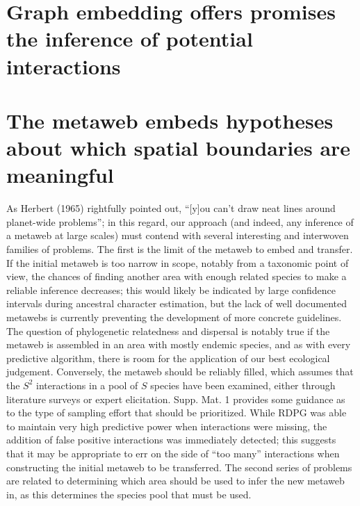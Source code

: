 \documentclass[11pt]{article}
\begin{document}
\hypertarget{graph-embedding-offers-promises-the-inference-of-potential-interactions}{%
\section{Graph embedding offers promises the inference of potential
interactions}\label{graph-embedding-offers-promises-the-inference-of-potential-interactions}}

\hypertarget{the-metaweb-embeds-hypotheses-about-which-spatial-boundaries-are-meaningful}{%
\section{The metaweb embeds hypotheses about which spatial boundaries
are
meaningful}\label{the-metaweb-embeds-hypotheses-about-which-spatial-boundaries-are-meaningful}}

As Herbert (1965) rightfully pointed out, ``{[}y{]}ou can't draw neat
lines around planet-wide problems''; in this regard, our approach (and
indeed, any inference of a metaweb at large scales) must contend with
several interesting and interwoven families of problems. The first is
the limit of the metaweb to embed and transfer. If the initial metaweb
is too narrow in scope, notably from a taxonomic point of view, the
chances of finding another area with enough related species to make a
reliable inference decreases; this would likely be indicated by large
confidence intervals during ancestral character estimation, but the lack
of well documented metawebs is currently preventing the development of
more concrete guidelines. The question of phylogenetic relatedness and
dispersal is notably true if the metaweb is assembled in an area with
mostly endemic species, and as with every predictive algorithm, there is
room for the application of our best ecological judgement. Conversely,
the metaweb should be reliably filled, which assumes that the \(S^2\)
interactions in a pool of \(S\) species have been examined, either
through literature surveys or expert elicitation. Supp. Mat. 1 provides
some guidance as to the type of sampling effort that should be
prioritized. While RDPG was able to maintain very high predictive power
when interactions were missing, the addition of false positive
interactions was immediately detected; this suggests that it may be
appropriate to err on the side of ``too many'' interactions when
constructing the initial metaweb to be transferred. The second series of
problems are related to determining which area should be used to infer
the new metaweb in, as this determines the species pool that must be
used.
\end{document}

